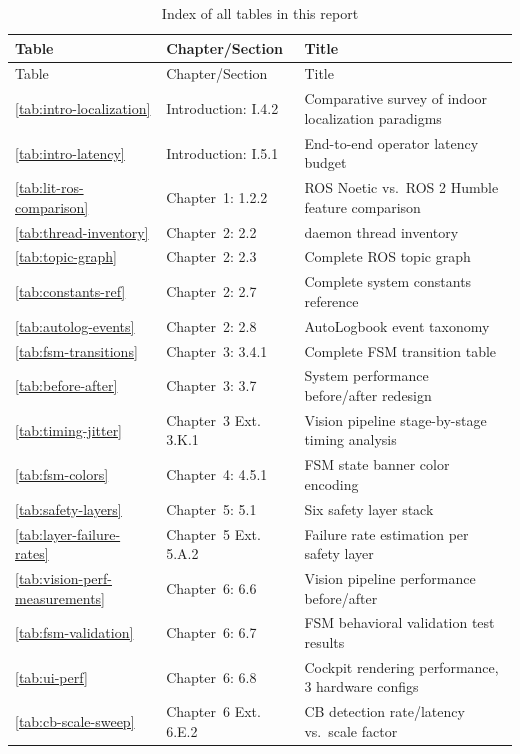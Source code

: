\begingroup\small
\begin{longtable}{@{}L{2.2cm}L{3.6cm}L{7.4cm}@{}}
\caption{Index of all tables in this report} \label{tab:table-index} \\
\toprule
Table & Chapter/Section & Title \\
\midrule
\endfirsthead
\toprule
Table & Chapter/Section & Title \\
\midrule
\endhead
\ref{tab:intro-localization} & Introduction: I.4.2 & Comparative survey of indoor localization paradigms \\
\ref{tab:intro-latency} & Introduction: I.5.1 & End-to-end operator latency budget \\
\ref{tab:lit-ros-comparison} & Chapter~1: 1.2.2 & ROS Noetic vs.\ ROS 2 Humble feature comparison \\
\ref{tab:thread-inventory} & Chapter~2: 2.2 &  daemon thread inventory \\
\ref{tab:topic-graph} & Chapter~2: 2.3 & Complete ROS topic graph \\
\ref{tab:constants-ref} & Chapter~2: 2.7 & Complete system constants reference \\
\ref{tab:autolog-events} & Chapter~2: 2.8 & AutoLogbook event taxonomy \\
\ref{tab:fsm-transitions} & Chapter~3: 3.4.1 & Complete FSM transition table \\
\ref{tab:before-after} & Chapter~3: 3.7 & System performance before/after redesign \\
\ref{tab:timing-jitter} & Chapter~3 Ext.\: 3.K.1 & Vision pipeline stage-by-stage timing analysis \\
\ref{tab:fsm-colors} & Chapter~4: 4.5.1 & FSM state banner color encoding \\
\ref{tab:safety-layers} & Chapter~5: 5.1 & Six safety layer stack \\
\ref{tab:layer-failure-rates} & Chapter~5 Ext.\: 5.A.2 & Failure rate estimation per safety layer \\
\ref{tab:vision-perf-measurements} & Chapter~6: 6.6 & Vision pipeline performance before/after \\
\ref{tab:fsm-validation} & Chapter~6: 6.7 & FSM behavioral validation test results \\
\ref{tab:ui-perf} & Chapter~6: 6.8 & Cockpit rendering performance, 3 hardware configs \\
\ref{tab:cb-scale-sweep} & Chapter~6 Ext.\: 6.E.2 & CB detection rate/latency vs.\ scale factor \\

\end{longtable}
